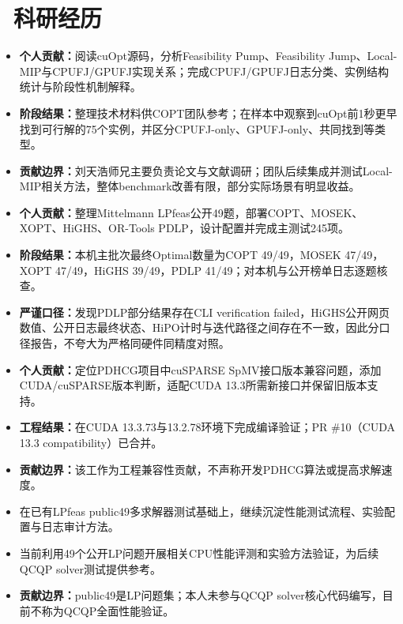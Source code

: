 \documentclass{resume}
\begin{document}
\section{\faLightbulbO\ 科研经历}
\begin{itemize}
  \item \textbf{个人贡献：}阅读cuOpt源码，分析Feasibility Pump、Feasibility Jump、Local-MIP与CPUFJ/GPUFJ实现关系；完成CPUFJ/GPUFJ日志分类、实例结构统计与阶段性机制解释。
  \item \textbf{阶段结果：}整理技术材料供COPT团队参考；在样本中观察到cuOpt前1秒更早找到可行解的75个实例，并区分CPUFJ-only、GPUFJ-only、共同找到等类型。
  \item \textbf{贡献边界：}刘天浩师兄主要负责论文与文献调研；团队后续集成并测试Local-MIP相关方法，整体benchmark改善有限，部分实际场景有明显收益。
\end{itemize}

\begin{itemize}
  \item \textbf{个人贡献：}整理Mittelmann LPfeas公开49题，部署COPT、MOSEK、XOPT、HiGHS、OR-Tools PDLP，设计配置并完成主测试245项。
  \item \textbf{阶段结果：}本机主批次最终Optimal数量为COPT 49/49，MOSEK 47/49，XOPT 47/49，HiGHS 39/49，PDLP 41/49；对本机与公开榜单日志逐题核查。
  \item \textbf{严谨口径：}发现PDLP部分结果存在CLI verification failed，HiGHS公开网页数值、公开日志最终状态、HiPO计时与迭代路径之间存在不一致，因此分口径报告，不夸大为严格同硬件同精度对照。
\end{itemize}

\begin{itemize}
  \item \textbf{个人贡献：}定位PDHCG项目中cuSPARSE SpMV接口版本兼容问题，添加CUDA/cuSPARSE版本判断，适配CUDA 13.3所需新接口并保留旧版本支持。
  \item \textbf{工程结果：}在CUDA 13.3.73与13.2.78环境下完成编译验证；PR \#10（CUDA 13.3 compatibility）已合并。
  \item \textbf{贡献边界：}该工作为工程兼容性贡献，不声称开发PDHCG算法或提高求解速度。
\end{itemize}

\begin{itemize}
  \item 在已有LPfeas public49多求解器测试基础上，继续沉淀性能测试流程、实验配置与日志审计方法。
  \item 当前利用49个公开LP问题开展相关CPU性能评测和实验方法验证，为后续QCQP solver测试提供参考。
  \item \textbf{贡献边界：}public49是LP问题集；本人未参与QCQP solver核心代码编写，目前不称为QCQP全面性能验证。
\end{itemize}
\end{document}
